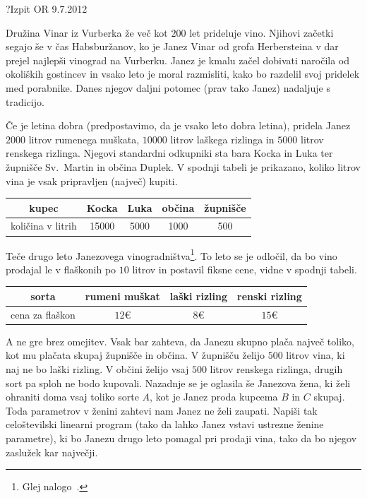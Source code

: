 \begin{naloga}{?}{Izpit OR 9.7.2012}
\begin{vprasanje}[vinar2]
Družina Vinar iz Vurberka že več kot $200$ let prideluje vino.
Njihovi začetki segajo še v čas Habsburžanov,
ko je Janez Vinar od grofa Herbersteina
v dar prejel najlepši vinograd na Vurberku.
Janez je kmalu začel dobivati naročila od okoliških gostincev
in vsako leto je moral razmisliti,
kako bo razdelil svoj pridelek med porabnike.
Danes njegov daljni potomec (prav tako Janez) nadaljuje s tradicijo.

Če je letina dobra (predpostavimo, da je vsako leto dobra letina),
pridela Janez $2000$ litrov rumenega muškata,
$10000$ litrov laškega rizlinga in $5000$ litrov renskega rizlinga.
Njegovi standardni odkupniki sta bara Kocka in Luka
ter župnišče Sv.~Martin in občina Duplek.
V spodnji tabeli je prikazano,
koliko litrov vina je vsak pripravljen (največ) kupiti.
\begin{center}
\begin{tabular}{c|cccc}
kupec & Kocka & Luka & občina & župnišče \\ \hline
količina v litrih & 15000 & 5000 & 1000 & 500
\end{tabular}
\end{center}
Teče drugo leto Janezovega vinogradništva\footnote{
Glej nalogo~.
}.
To leto se je odločil,
da bo vino prodajal le v flaškonih po $10$ litrov
in postavil fiksne cene, vidne v spodnji tabeli.
\begin{center}
\begin{tabular}{c|ccc}
sorta & rumeni muškat & laški rizling & renski rizling \\ \hline
cena za flaškon & $12 €$ & $8 €$ & $15 €$
\end{tabular}
\end{center}
A ne gre brez omejitev.
Vsak bar zahteva, da Janezu skupno plača največ toliko,
kot mu plačata skupaj župnišče in občina.
V župnišču želijo $500$ litrov vina, ki naj ne bo laški rizling.
V občini želijo vsaj $500$ litrov renskega rizlinga,
drugih sort pa sploh ne bodo kupovali.
Nazadnje se je oglasila še Janezova žena,
ki želi ohraniti doma vsaj toliko sorte $A$,
kot je Janez proda kupcema $B$ in $C$ skupaj.
Toda parametrov v ženini zahtevi nam Janez ne želi zaupati.
Napiši tak celoštevilski linearni program
(tako da lahko Janez vstavi ustrezne ženine parametre),
ki bo Janezu drugo leto pomagal pri prodaji vina,
tako da bo njegov zaslužek kar največji.
\end{vprasanje}
\begin{odgovor}
\end{odgovor}
\end{naloga}



